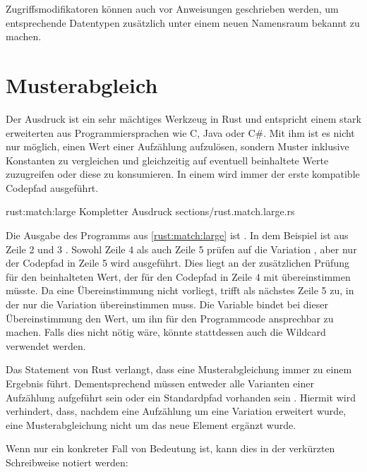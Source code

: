 Zugriffsmodifikatoren können auch vor  Anweisungen geschrieben werden, um entsprechende Datentypen zusätzlich unter einem neuen Namensraum bekannt zu machen.


\section{Musterabgleich}
\label{rust:match}

Der  Ausdruck ist ein sehr mächtiges Werkzeug in Rust und entspricht einem stark erweiterten  aus Programmiersprachen wie C, Java oder C\#.
Mit ihm ist es nicht nur möglich, einen Wert einer Aufzählung aufzulösen, sondern Muster inklusive Konstanten zu vergleichen und gleichzeitig auf eventuell beinhaltete Werte zuzugreifen oder diese zu konsumieren.
In einem  wird immer der erste kompatible Codepfad ausgeführt.

\rustcinclude
	{rust:match:large}
	{Kompletter  Ausdruck}
	{sections/rust.match.large.rs}

Die Ausgabe des Programms aus \autoref{rust:match:large} ist .
In dem Beispiel ist  aus Zeile 2 und 3 .
Sowohl Zeile 4 als auch Zeile 5 prüfen auf die Variation , aber nur der Codepfad in Zeile 5 wird ausgeführt.
Dies liegt an der zusätzlichen Prüfung für den beinhalteten Wert, der für den Codepfad in Zeile 4 mit  übereinstimmen müsste.
Da eine Übereinstimmung nicht vorliegt, trifft als nächstes Zeile 5 zu, in der nur die Variation  übereinstimmen muss.
Die Variable  bindet bei dieser Übereinstimmung den Wert, um ihn für den Programmcode ansprechbar zu machen.
Falls dies nicht nötig wäre, könnte stattdessen auch die Wildcard \rustcinline{_} verwendet werden.

Das  Statement von Rust verlangt, dass eine Musterabgleichung immer zu einem Ergebnis führt.
Dementsprechend müssen entweder alle Varianten einer Aufzählung aufgeführt sein oder ein Standardpfad vorhanden sein \rustcinline{_ => \{ \} }.
Hiermit wird verhindert, dass, nachdem eine Aufzählung um eine Variation erweitert wurde, eine Musterabgleichung nicht um das neue Element ergänzt wurde.

\clearpage
Wenn nur ein konkreter Fall von Bedeutung ist, kann dies in der verkürzten  Schreibweise notiert werden:

